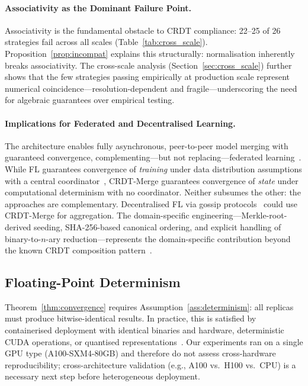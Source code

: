 \documentclass[10pt,letterpaper]{article}
\begin{document}
\paragraph{Associativity as the Dominant Failure Point.}
Associativity is the fundamental obstacle to CRDT compliance: 22--25 of 26 strategies fail across all scales (Table~\ref{tab:cross_scale}).
Proposition~\ref{prop:incompat} explains this structurally: normalisation inherently breaks associativity.
The cross-scale analysis (Section~\ref{sec:cross_scale}) further shows that the few strategies passing empirically at production scale represent numerical coincidence---resolution-dependent and fragile---underscoring the need for algebraic guarantees over empirical testing.

\paragraph{Implications for Federated and Decentralised Learning.}
The architecture enables fully asynchronous, peer-to-peer model merging with guaranteed convergence, complementing---but not replacing---federated learning~\cite{mcmahan2017communication}.
While FL guarantees convergence of \emph{training} under data distribution assumptions with a central coordinator~\cite{kairouz2021advances, li2020fedprox}, CRDT-Merge guarantees convergence of \emph{state} under computational determinism with no coordinator.
Neither subsumes the other: the approaches are complementary.
Decentralised FL via gossip protocols~\cite{lian2017decentralized, koloskova2019decentralized} could use CRDT-Merge for aggregation.
The domain-specific engineering---Merkle-root-derived seeding, SHA-256-based canonical ordering, and explicit handling of binary-to-$n$-ary reduction---represents the domain-specific contribution beyond the known CRDT composition pattern~\cite{shapiro2011comprehensive}.

\subsection{Floating-Point Determinism}\label{sec:fp_determinism}

Theorem~\ref{thm:convergence} requires Assumption~\ref{ass:determinism}: all replicas must produce bitwise-identical results.
In practice, this is satisfied by containerised deployment with identical binaries and hardware, deterministic CUDA operations, or quantised representations~\cite{schneider1990implementing}.
Our experiments ran on a single GPU type (A100-SXM4-80GB) and therefore do not assess cross-hardware reproducibility; cross-architecture validation (e.g., A100 vs.\ H100 vs.\ CPU) is a necessary next step before heterogeneous deployment.
\end{document}
